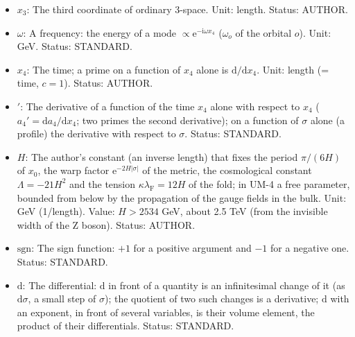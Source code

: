 \documentclass[
  10pt,
]{article}
\begin{document}
\begin{itemize}
  perturbations the comoving wave number of a Fourier mode,
  \(k = \lvert\vec k\rvert\). Unit: GeV (1/length). Status: STANDARD.
\item
  \(x_3\): The third coordinate of ordinary 3-space. Unit: length.
  Status: AUTHOR.
\item
  \(\omega\): A frequency: the energy of a mode
  \(\propto \mathrm{e}^{-\mathrm{i}\omega x_4}\) (\(\omega_o\) of the
  orbital \(o\)). Unit: GeV. Status: STANDARD.
\item
  \(x_4\): The time; a prime on a function of \(x_4\) alone is
  \(\mathrm{d}/\mathrm{d}x_4\). Unit: length (= time, \(c = 1\)).
  Status: AUTHOR.
\item
  \({}'\): The derivative of a function of the time \(x_4\) alone with
  respect to \(x_4\) (\(a_4' = \mathrm{d}a_4/\mathrm{d}x_4\); two primes
  the second derivative); on a function of \(\sigma\) alone (a profile)
  the derivative with respect to \(\sigma\). Status: STANDARD.
\item
  \(H\): The author's constant (an inverse length) that fixes the period
  \(\pi/(6H)\) of \(x_0\), the warp factor
  \(\mathrm{e}^{-2H\lvert\sigma\rvert}\) of the metric, the cosmological
  constant \(\Lambda = -21H^2\) and the tension
  \(\kappa\lambda_{\mathrm{F}} = 12H\) of the fold; in UM-4 a free
  parameter, bounded from below by the propagation of the gauge fields
  in the bulk. Unit: GeV (1/length). Value: \(H > 2534\) GeV, about 2.5
  TeV (from the invisible width of the Z boson). Status: AUTHOR.
\item
  \(\mathrm{sgn}\): The sign function: \(+1\) for a positive argument
  and \(-1\) for a negative one. Status: STANDARD.
\item
  \(\mathrm{d}\): The differential: \(\mathrm{d}\) in front of a
  quantity is an infinitesimal change of it (as \(\mathrm{d}\sigma\), a
  small step of \(\sigma\)); the quotient of two such changes is a
  derivative; \(\mathrm{d}\) with an exponent, in front of several
  variables, is their volume element, the product of their
  differentials. Status: STANDARD.
\end{itemize}
\end{document}
